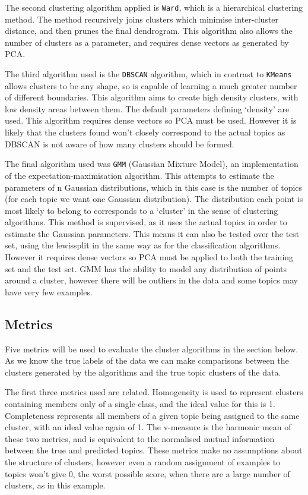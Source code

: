 \documentclass{article}
\begin{document}
The second clustering algorithm applied is \verb|Ward|, which is a hierarchical clustering method. The method recursively joins clusters which minimise inter-cluster distance, and then prunes the final dendrogram. This algorithm also allows the number of clusters as a parameter, and requires dense vectors as generated by PCA.

The third algorithm used is the \verb|DBSCAN| algorithm, which in contrast to \verb|KMeans| allows clusters to be any shape, so is capable of learning a much greater number of different boundaries. This algorithm aims to create high density clusters, with low density areas between them. The default parameters defining `density' are used. This algorithm requires dense vectors so PCA must be used. However it is likely that the clusters found won't closely correspond to the actual topics as DBSCAN is not aware of how many clusters should be formed.

The final algorithm used was \verb|GMM| (Gaussian Mixture Model), an implementation of the expectation-maximisation algorithm. This attempts to estimate the parameters of n Gaussian distributions, which in this case is the number of topics (for each topic we want one Gaussian distribution). The distribution each point is most likely to belong to corresponds to a `cluster' in the sense of clustering algorithms. This method is supervised, as it uses the actual topics in order to estimate the Gaussian parameters. This means it can also be tested over the test set, using the lewissplit in the same way as for the classification algorithms. However it requires dense vectors so PCA must be applied to both the training set and the test set. GMM has the ability to model any distribution of points around a cluster, however there will be outliers in the data and some topics may have very few examples.

\subsection{Metrics}
Five metrics will be used to evaluate the cluster algorithms in the section below. As we know the true labels of the data we can make comparisons between the clusters generated by the algorithms and the true topic clusters of the data.

The first three metrics used are related. Homogeneity is used to represent clusters containing members only of a single class, and the ideal value for this is 1. Completeness represents all members of a given topic being assigned to the same cluster, with an ideal value again of 1. The v-measure is the harmonic mean of these two metrics, and is equivalent to the normalised mutual information between the true and predicted topics. These metrics make no assumptions about the structure of clusters, however even a random assignment of examples to topics won't give 0, the worst possible score, when there are a large number of clusters, as in this example.
\end{document}
